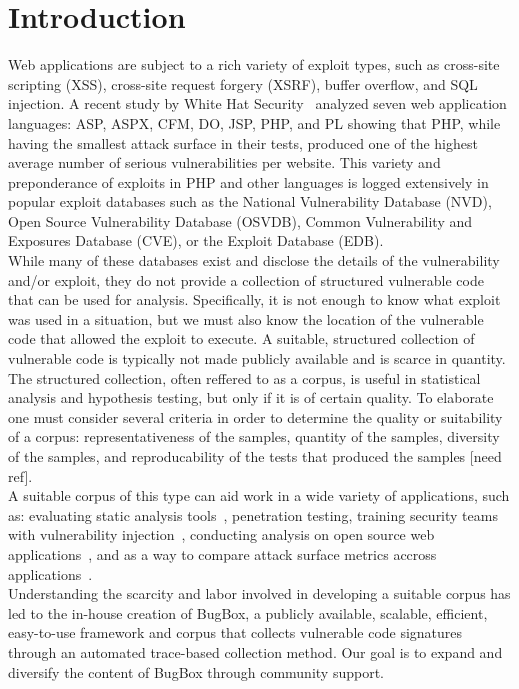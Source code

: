 \documentclass[letterpaper,twocolumn,10pt]{article}
\begin{document}
\section{Introduction}
Web applications are subject to a rich variety of exploit types, such as cross-site scripting (XSS), cross-site request forgery (XSRF), buffer overflow, and SQL injection.  A recent study by White Hat Security~\cite{WhiteHat:2010:Online} analyzed seven web application languages: ASP, ASPX, CFM, DO, JSP, PHP, and PL showing that PHP, while having the smallest attack surface in their tests, produced one of the highest average number of serious vulnerabilities per website.  This variety and preponderance of exploits in PHP and other languages is logged extensively in popular exploit databases such as the National Vulnerability Database (NVD), Open Source Vulnerability Database (OSVDB), Common Vulnerability and Exposures Database (CVE), or the Exploit Database (EDB).\\

While many of these databases exist and disclose the details of the vulnerability and/or exploit, they do not provide a collection of structured vulnerable code that can be used for analysis.  Specifically, it is not enough to know what exploit was used in a situation, but we must also know the location of the vulnerable code that allowed the exploit to execute.  A suitable, structured collection of vulnerable code is typically not made publicly available and is scarce in quantity.  The structured collection, often reffered to as a corpus, is useful in statistical analysis and hypothesis testing, but only if it is of certain quality.  To elaborate one must consider several criteria in order to determine the quality or suitability of a corpus: representativeness of the samples, quantity of the samples, diversity of the samples, and reproducability of the tests that produced the samples [need ref].\\

A suitable corpus of this type can aid work in a wide variety of applications, such as:  evaluating static analysis tools~\cite{Zitser:2004:TSA:1041685.1029911}, penetration testing, training security teams with vulnerability injection~\cite{4725309}, conducting analysis on open source web applications~\cite{DBLP:journals/ese/HuynhM10}, and as a way to compare attack surface metrics accross applications~\cite{Stuckman:2012:CAA:2372225.2372229}.\\

Understanding the scarcity and labor involved in developing a suitable corpus has led to the in-house creation of BugBox, a publicly available, scalable, efficient, easy-to-use framework and corpus that collects vulnerable code signatures through an automated trace-based collection method.  Our goal is to expand and diversify the content of BugBox through community support.  
\end{document}
